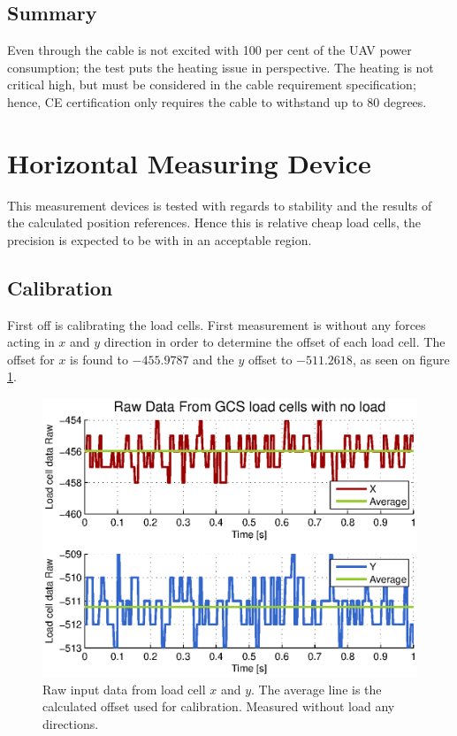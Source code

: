 \subsection{Summary}
Even through the cable is not excited with 100 per cent of the UAV power consumption; the test puts the heating issue in perspective. The heating is not critical high, but must be considered in the cable requirement specification; hence, CE certification only requires the cable to withstand up to 80 degrees\cite{Parliament2006}.    



\section{Horizontal Measuring Device}
This measurement devices is tested with regards to stability and the results of the calculated position references. Hence this is relative cheap load cells, the precision is expected to be with in an acceptable region.

\subsection{Calibration}
First off is calibrating the load cells. First measurement is without any forces acting in $x$ and $y$ direction in order to determine the offset of each load cell.
The offset for $x$ is found to $-455.9787$ and the $y$ offset to $-511.2618$, as seen on figure \ref{fig:HMDcalib}.\\

\begin{figure}[hbtp]
\centering
\includegraphics[scale=1]{graphics/gcs_test/calib_0_data_raw.eps}
\caption[Raw data from load cell]{Raw input data from load cell $x$ and $y$. The average line is the calculated offset used for calibration. Measured without load any directions.}
\label{fig:HMDcalib}
\end{figure}

